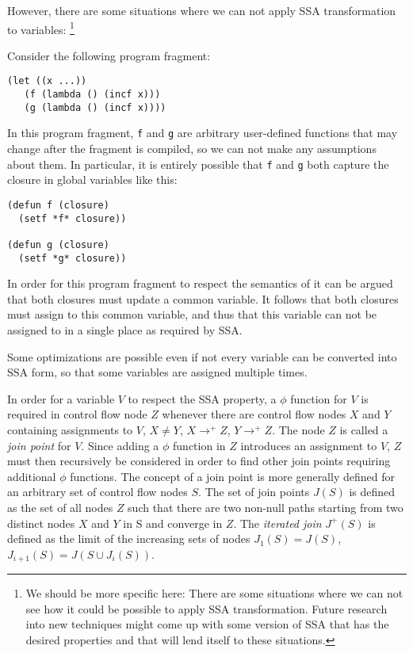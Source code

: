 However, there are some situations where we can not apply SSA
transformation to variables:%
\footnote{We should be more specific here: There are some situations
  where we can not see how it could be possible to apply SSA
  transformation.  Future research into new techniques might come up
  with some version of SSA that has the desired properties and that
  will lend itself to these situations.}

Consider the following program fragment:

\begin{verbatim}
(let ((x ...))
   (f (lambda () (incf x)))
   (g (lambda () (incf x))))
\end{verbatim}

In this program fragment, \texttt{f} and \texttt{g} are arbitrary
user-defined functions that may change after the fragment is compiled,
so we can not make any assumptions about them.  In particular, it is
entirely possible that \texttt{f} and \texttt{g} both capture the
closure in global variables like this:

\begin{verbatim}
(defun f (closure)
  (setf *f* closure))

(defun g (closure)
  (setf *g* closure))
\end{verbatim}

In order for this program fragment to respect the semantics of \commonlisp{}
it can be argued that both closures must update a common variable.  It
follows that both closures must assign to this common variable, and
thus that this variable can not be assigned to in a single place as
required by SSA. 

Some optimizations are possible even if not every variable can be
converted into SSA form, so that some variables are assigned multiple
times.  

In order for a variable $V$ to respect the SSA property, a $\phi$
function for $V$ is required in control flow node $Z$ whenever there
are control flow nodes $X$ and $Y$ containing assignments to $V$, $X
\ne Y$, $X \rightarrow^+ Z$, $Y \rightarrow^+ Z$.  The node $Z$ is
called a \emph{join point} for $V$.  Since adding a $\phi$ function in
$Z$ introduces an assignment to $V$, $Z$ must then recursively be
considered in order to find other join points requiring additional
$\phi$ functions.  The concept of a join point is more generally
defined for an arbitrary set of control flow nodes $S$.  The set of
join points $J(S)$ is defined as the set of all nodes $Z$ such that
there are two non-null paths starting from two distinct nodes $X$ and
$Y$ in S and converge in $Z$.  The \emph{iterated join} $J^+(S)$ is
defined as the limit of the increasing sets of nodes $J_1(S) = J(S)$,
$J_{i+1}(S) = J(S \cup J_i(S))$.

